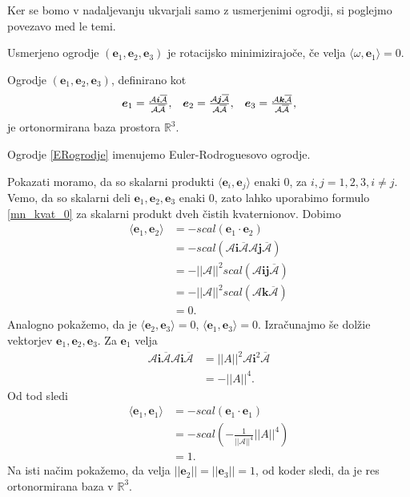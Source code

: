 \documentclass[mat1]{fmfdelo}
\newcommand{\R}{\mathbb R}
\newcommand{\ii}{\boldsymbol i}
\newcommand{\jj}{\boldsymbol j}
\newcommand{\kk}{\boldsymbol k}
\newcommand{\e}{\boldsymbol e}
\newcommand{\A}{\mathcal A}
\begin{document}
Ker se bomo v nadaljevanju ukvarjali samo z usmerjenimi ogrodji, si poglejmo povezavo med le temi.
\begin{definicija}
Usmerjeno ogrodje $(\e_1,\e_2,\e_3)$ je rotacijsko minimizirajoče, če velja $\langle \omega,\e_1\rangle = 0.$
\end{definicija}

\begin{trditev}
Ogrodje $(\e_1,\e_2,\e_3)$, definirano kot 
\begin{equation}{\label{ERogrodje}}
\begin{array}{c c c}
\e_1 = \frac{\A\ii\overline{\A}}{\A\overline{\A}}, &
\e_2 = \frac{\A\jj\overline{\A}}{\A\overline{\A}}, &
\e_3 = \frac{\A\kk\overline{\A}}{\A\overline{\A}},
\end{array}
\end{equation}
je ortonormirana baza prostora $\R^3$.
\end{trditev}
\begin{opomba}
	Ogrodje \ref{ERogrodje} imenujemo Euler-Rodroguesovo ogrodje.
\end{opomba}
\begin{dokaz}
Pokazati moramo, da so skalarni produkti $\langle \e_i, \e_j \rangle $ enaki 0, za $i, j = 1,2,3, i \neq j$. Vemo, da so skalarni deli $\e_1,\e_2,\e_3$ enaki 0, zato lahko uporabimo formulo \ref{mn_kvat_0} za skalarni produkt dveh čistih kvaternionov. Dobimo
\begin{equation*}
\begin{split}
	\langle \e_1,\e_2 \rangle& = -scal \left( \e_1 \cdot \e_2 \right) \\
	& = -scal \left( \A \ii \overline{\A} \A \jj \overline{\A} \right) \\
	&= - ||\A||^2 scal \left( \A \ii \jj \overline{\A} \right) \\
	& = - ||\A||^2 scal \left( \A \kk \overline{\A} \right) \\
	& = 0.
\end{split}
\end{equation*}
Analogno pokažemo, da je $\langle \e_2,\e_3 \rangle = 0$, $\langle \e_1,\e_3 \rangle = 0$.
Izračunajmo še dolžie vektorjev $\e_1,\e_2,\e_3$. Za $\e_1$ velja
\begin{equation*}
\begin{split}
\A \ii \overline{\A} \A \ii \overline{\A} 	&= ||A||^2 \A \ii^2 \overline{\A} \\
	&= -||A||^4.
\end{split}
\end{equation*}
Od tod sledi
\begin{equation*}
\begin{split}
	\langle \e_1,\e_1 \rangle &= -scal \left( \e_1 \cdot \e_1 \right) \\
&= -scal (-\frac{1}{||\A||^4}||A||^4) \\
&= 1.
\end{split}
\end{equation*}
Na isti načim pokažemo, da velja $||\e_2||=||\e_3||=1$, od koder sledi, da je res ortonormirana baza v $\R^3$.
\end{dokaz}
\end{document}
